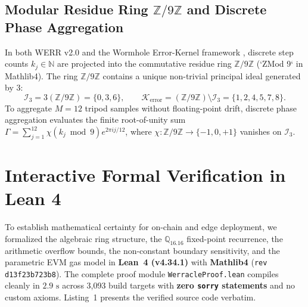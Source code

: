 \documentclass[10pt,a4paper]{article}
\begin{document}
\subsection{Modular Residue Ring $\mathbb{Z}/9\mathbb{Z}$ and Discrete Phase Aggregation}
In both WERR v2.0 \cite{dagli2026werr} and the Wormhole Error-Kernel framework \cite{dagli2026wormhole}, discrete step counts $k_j \in \mathbb{N}$ are projected into the commutative residue ring $\mathbb{Z}/9\mathbb{Z}$ (`ZMod 9` in Mathlib4). The ring $\mathbb{Z}/9\mathbb{Z}$ contains a unique non-trivial principal ideal generated by $3$:
\begin{equation}
    \mathcal{I}_3 = 3(\mathbb{Z}/9\mathbb{Z}) = \{0, 3, 6\}, \qquad \mathcal{K}_{\text{error}} = (\mathbb{Z}/9\mathbb{Z}) \setminus \mathcal{I}_3 = \{1, 2, 4, 5, 7, 8\}.
\end{equation}
To aggregate $M = 12$ tripod samples without floating-point drift, discrete phase aggregation evaluates the finite root-of-unity sum $\Gamma = \sum_{j=1}^{12} \chi(k_j \bmod 9) e^{2\pi i j / 12}$, where $\chi : \mathbb{Z}/9\mathbb{Z} \to \{-1, 0, +1\}$ vanishes on $\mathcal{I}_3$.

\section{Interactive Formal Verification in Lean 4}

To establish mathematical certainty for on-chain and edge deployment, we formalized the algebraic ring structure, the $\mathbb{Q}_{16.16}$ fixed-point recurrence, the arithmetic overflow bounds, the non-constant boundary sensitivity, and the parametric EVM gas model in \textbf{Lean~4 (v4.34.1)} with \textbf{Mathlib4} (\texttt{rev d13f23b723b8}). The complete proof module \texttt{WerracleProof.lean} compiles cleanly in $2.9\text{ s}$ across 3,093 build targets with \textbf{zero \texttt{sorry} statements} and no custom axioms. Listing~1 presents the verified source code verbatim.
\end{document}
